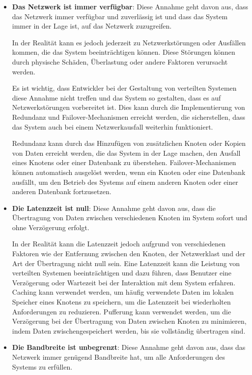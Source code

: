 \documentclass[../vs-script-first-v01.tex]{subfiles}
\begin{document}
\begin{itemize}  
\item \textbf{Das Netzwerk ist immer verfügbar}: Diese Annahme geht davon aus, dass das Netzwerk immer verfügbar und zuverlässig ist und dass das System immer in der Lage ist, auf das Netzwerk zuzugreifen.

In der Realität kann es jedoch jederzeit zu Netzwerkstörungen oder Ausfällen kommen, die das System beeinträchtigen können. Diese Störungen können durch physische Schäden, Überlastung oder andere Faktoren verursacht werden.

Es ist wichtig, dass Entwickler bei der Gestaltung von verteilten Systemen diese Annahme nicht treffen und das System so gestalten, dass es auf Netzwerkstörungen vorbereitet ist. Dies kann durch die Implementierung von Redundanz und Failover-Mechanismen erreicht werden, die sicherstellen, dass das System auch bei einem Netzwerkausfall weiterhin funktioniert.

Redundanz kann durch das Hinzufügen von zusätzlichen Knoten oder Kopien von Daten erreicht werden, die das System in der Lage machen, den Ausfall eines Knotens oder einer Datenbank zu überstehen. Failover-Mechanismen können automatisch ausgelöst werden, wenn ein Knoten oder eine Datenbank ausfällt, um den Betrieb des Systems auf einem anderen Knoten oder einer anderen Datenbank fortzusetzen.

\item \textbf{Die Latenzzeit ist null}: Diese Annahme geht davon aus, dass die Übertragung von Daten zwischen verschiedenen Knoten im System sofort und ohne Verzögerung erfolgt.

In der Realität kann die Latenzzeit jedoch aufgrund von verschiedenen Faktoren wie der Entfernung zwischen den Knoten, der Netzwerklast und der Art der Übertragung nicht null sein. Eine Latenzzeit kann die Leistung von verteilten Systemen beeinträchtigen und dazu führen, dass Benutzer eine Verzögerung oder Wartezeit bei der Interaktion mit dem System erfahren.
Caching kann verwendet werden, um häufig verwendete Daten im lokalen Speicher eines Knotens zu speichern, um die Latenzzeit bei wiederholten Anforderungen zu reduzieren. Pufferung kann verwendet werden, um die Verzögerung bei der Übertragung von Daten zwischen Knoten zu minimieren, indem Daten zwischengespeichert werden, bis sie vollständig übertragen sind.
\item \textbf{Die Bandbreite ist unbegrenzt}: Diese Annahme geht davon aus, dass das Netzwerk immer genügend Bandbreite hat, um alle Anforderungen des Systems zu erfüllen.


\end{itemize}
\end{document}
